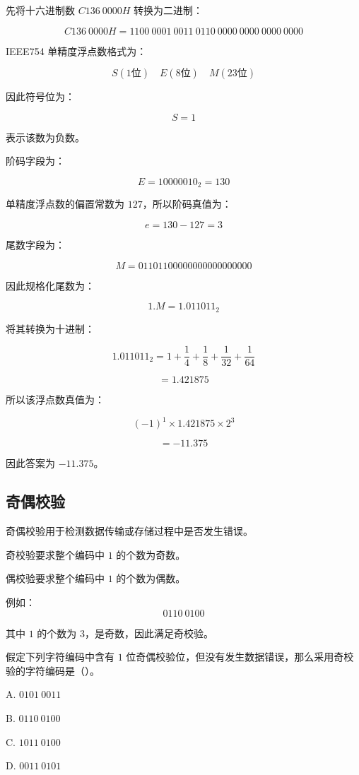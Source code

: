 \begin{analysisenv}
先将十六进制数 $C136\ 0000H$ 转换为二进制：

\[
C136\ 0000H =
1100\ 0001\ 0011\ 0110\ 0000\ 0000\ 0000\ 0000
\]

IEEE754 单精度浮点数格式为：

\[
S(1\text{位}) \quad E(8\text{位}) \quad M(23\text{位})
\]

因此符号位为：

\[
S=1
\]

表示该数为负数。

阶码字段为：

\[
E = 10000010_2 = 130
\]

单精度浮点数的偏置常数为 $127$，所以阶码真值为：

\[
e = 130 - 127 = 3
\]

尾数字段为：

\[
M = 01101100000000000000000
\]

因此规格化尾数为：

\[
1.M = 1.011011_2
\]

将其转换为十进制：

\[
1.011011_2
= 1 + \frac{1}{4} + \frac{1}{8} + \frac{1}{32} + \frac{1}{64}
\]

\[
= 1.421875
\]

所以该浮点数真值为：

\[
(-1)^1 \times 1.421875 \times 2^3
\]

\[
= -11.375
\]

因此答案为 $-11.375$。
\end{analysisenv}



\subsection{奇偶校验}

\begin{knowledge}
奇偶校验用于检测数据传输或存储过程中是否发生错误。

奇校验要求整个编码中 $1$ 的个数为奇数。

偶校验要求整个编码中 $1$ 的个数为偶数。

例如：
\[
0110\ 0100
\]

其中 $1$ 的个数为 $3$，是奇数，因此满足奇校验。
\end{knowledge}
\begin{question}
假定下列字符编码中含有 $1$ 位奇偶校验位，但没有发生数据错误，那么采用奇校验的字符编码是（）。

A. $0101\ 0011$

B. $0110\ 0100$

C. $1011\ 0100$

D. $0011\ 0101$
\end{question}

